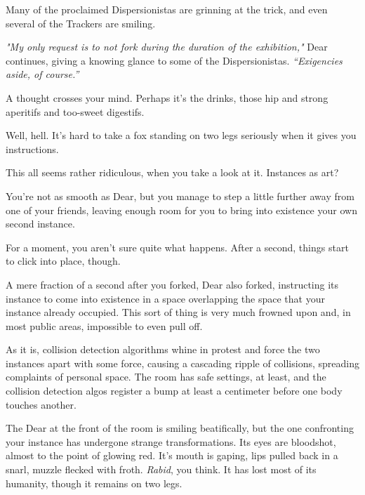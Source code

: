 Many of the proclaimed Dispersionistas are grinning at the trick, and even several of the Trackers are smiling.

\emph{"My only request is to not fork during the duration of the exhibition,"} Dear continues, giving a knowing glance to some of the Dispersionistas. \emph{``Exigencies aside, of course.''}

A thought crosses your mind. Perhaps it's the drinks, those hip and strong aperitifs and too-sweet digestifs.

\newpage

\null
\vfill

Well, hell. It's hard to take a fox standing on two legs seriously when it gives you instructions.

\vfill

\newpage

\null
\vfill

This all seems rather ridiculous, when you take a look at it. Instances as art?

\vfill

\newpage

\null
\vfill

You're not as smooth as Dear, but you manage to step a little further away from one of your friends, leaving enough room for you to bring into existence your own second instance.

\vfill

\newpage

For a moment, you aren't sure quite what happens. After a second, things start to click into place, though.

A mere fraction of a second after you forked, Dear also forked, instructing its instance to come into existence in a space overlapping the space that your instance already occupied. This sort of thing is very much frowned upon and, in most public areas, impossible to even pull off.

As it is, collision detection algorithms whine in protest and force the two instances apart with some force, causing a cascading ripple of collisions, spreading complaints of personal space. The room has safe settings, at least, and the collision detection algos register a bump at least a centimeter before one body touches another.

The Dear at the front of the room is smiling beatifically, but the one confronting your instance has undergone strange transformations. Its eyes are bloodshot, almost to the point of glowing red. It's mouth is gaping, lips pulled back in a snarl, muzzle flecked with froth. \emph{Rabid}, you think. It has lost most of its humanity, though it remains on two legs.

